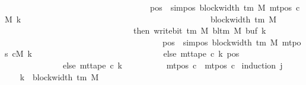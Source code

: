 \begin{isabellebody}
\ \ \ \ \ \ \ \ \ \ \ \ \ \ \ \ \ \ \ \ \ \ \ \ \ \ \ \ \ \ \ \ \ \ {\isasymand}\ pos\ {\isacharless}{\kern0pt}\ sim{\isacharunderscore}{\kern0pt}pos\ {\isacharparenleft}{\kern0pt}block{\isacharunderscore}{\kern0pt}width\ {\isacharparenleft}{\kern0pt}{\isasymGamma}{\isacharunderscore}{\kern0pt}tm\ M{\isacharparenright}{\kern0pt}{\isacharparenright}{\kern0pt}\ {\isacharparenleft}{\kern0pt}mt{\isacharunderscore}{\kern0pt}pos\ cM\ k{\isacharparenright}{\kern0pt}\isanewline
\ \ \ \ \ \ \ \ \ \ \ \ \ \ \ \ \ \ \ \ \ \ \ \ \ \ \ \ \ \ \ \ \ \ \ \ \ \ \ \ \ \ \ \ {\isacharplus}{\kern0pt}\ block{\isacharunderscore}{\kern0pt}width\ {\isacharparenleft}{\kern0pt}{\isasymGamma}{\isacharunderscore}{\kern0pt}tm\ M{\isacharparenright}{\kern0pt}\isanewline
\ \ \ \ \ \ \ \ \ \ \ \ \ \ \ \ \ \ \ \ \ \ \ \ \ \ \ \ \ \ \ then\ write{\isacharunderscore}{\kern0pt}bit\ {\isacharparenleft}{\kern0pt}{\isasymGamma}{\isacharunderscore}{\kern0pt}tm\ M{\isacharparenright}{\kern0pt}\ {\isacharparenleft}{\kern0pt}bl{\isacharunderscore}{\kern0pt}tm\ M{\isacharparenright}{\kern0pt}\ {\isacharparenleft}{\kern0pt}buf\ k{\isacharparenright}{\kern0pt}\isanewline
\ \ \ \ \ \ \ \ \ \ \ \ \ \ \ \ \ \ \ \ \ \ \ \ \ \ \ \ \ \ \ \ \ \ \ \ \ \ {\isacharparenleft}{\kern0pt}pos\ {\isacharminus}{\kern0pt}\ sim{\isacharunderscore}{\kern0pt}pos\ {\isacharparenleft}{\kern0pt}block{\isacharunderscore}{\kern0pt}width\ {\isacharparenleft}{\kern0pt}{\isasymGamma}{\isacharunderscore}{\kern0pt}tm\ M{\isacharparenright}{\kern0pt}{\isacharparenright}{\kern0pt}\ {\isacharparenleft}{\kern0pt}mt{\isacharunderscore}{\kern0pt}pos\ cM\ k{\isacharparenright}{\kern0pt}{\isacharparenright}{\kern0pt}\isanewline
\ \ \ \ \ \ \ \ \ \ \ \ \ \ \ \ \ \ \ \ \ \ \ \ \ \ \ \ \ \ \ else\ mt{\isacharunderscore}{\kern0pt}tape\ c{}\ k\ pos{\isacharparenright}{\kern0pt}{\isacharparenright}{\kern0pt}\isanewline
\ \ \ \ \ \ \ \ \ \ \ \ \ \ else\ mt{\isacharunderscore}{\kern0pt}tape\ c{}\ k{\isacharparenright}{\kern0pt}\isanewline
\ \ \ \ \ \ \ \ \ {\isasymand}\ mt{\isacharunderscore}{\kern0pt}pos\ c\ {\isacharequal}{\kern0pt}\ mt{\isacharunderscore}{\kern0pt}pos\ c{}{\isacharparenright}{\kern0pt}{\isachardoublequoteclose}\isanewline
%
\isadelimproof
%
\endisadelimproof
%
\isatagproof
{}\isamarkupfalse%
\ {\isacharparenleft}{\kern0pt}induction\ j{\isacharparenright}{\kern0pt}\isanewline
\ \ \isamarkupfalse%
\ {}\isanewline
\ \ \isamarkupfalse%
\ {\isacharquery}{\kern0pt}k\ {\isacharequal}{\kern0pt}\ {\isachardoublequoteopen}block{\isacharunderscore}{\kern0pt}width\ {\isacharparenleft}{\kern0pt}{\isasymGamma}{\isacharunderscore}{\kern0pt}tm\ M{\isacharparenright}{\kern0pt}{\isachardoublequoteclose}\isanewline

\end{isabellebody}
